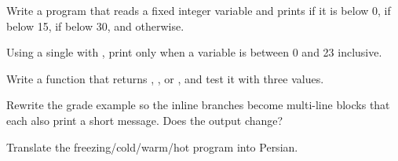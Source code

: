 \exercise Write a program that reads a fixed integer variable  and
prints  if it is below 0,  if below 15,
 if below 30, and  otherwise.

\exercise Using a single  with , print  only
when a variable  is between 0 and 23 inclusive.

\exercise Write a function  that returns ,
, or , and test it with three values.

\exercise Rewrite the grade example so the inline branches become multi-line
blocks that each also print a short message. Does the output change?

\exercise Translate the freezing/cold/warm/hot program into Persian.
